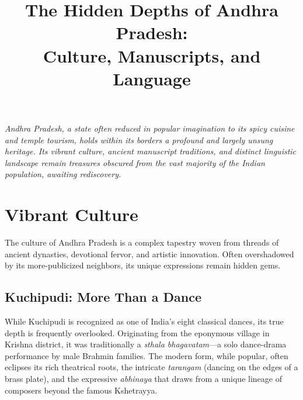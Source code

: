 \documentclass{article}
\title{\textbf{The Hidden Depths of Andhra Pradesh: \\ Culture, Manuscripts, and Language}}
\author{}
\date{}
\begin{document}
\maketitle

\begin{center}
\begin{minipage}{0.8\textwidth}
\small
\textit{Andhra Pradesh, a state often reduced in popular imagination to its spicy cuisine and temple tourism, holds within its borders a profound and largely unsung heritage. Its vibrant culture, ancient manuscript traditions, and distinct linguistic landscape remain treasures obscured from the vast majority of the Indian population, awaiting rediscovery.}
\end{minipage}
\end{center}

\section{Vibrant Culture}
The culture of Andhra Pradesh is a complex tapestry woven from threads of ancient dynasties, devotional fervor, and artistic innovation. Often overshadowed by its more-publicized neighbors, its unique expressions remain hidden gems.

\subsection{Kuchipudi: More Than a Dance}
While Kuchipudi is recognized as one of India's eight classical dances, its true depth is frequently overlooked. Originating from the eponymous village in Krishna district, it was traditionally a \textit{sthala bhagavatam}—a solo dance-drama performance by male Brahmin families. The modern form, while popular, often eclipses its rich theatrical roots, the intricate \textit{tarangam} (dancing on the edges of a brass plate), and the expressive \textit{abhinaya} that draws from a unique lineage of composers beyond the famous Kshetrayya.
\end{document}
